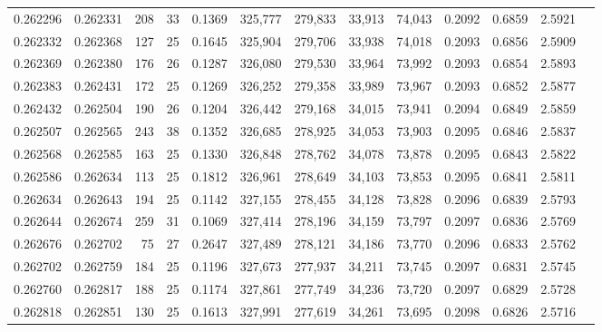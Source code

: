 \begin{tabular}{rrrrrrrrrrrrr}
0.262296 & 0.262331 &   208 &  33 &                                     0.1369 & 325,777 & 279,833 &  33,913 &  74,043 & 0.2092 & 0.6859 & 2.5921 \\
0.262332 & 0.262368 &   127 &  25 &                                     0.1645 & 325,904 & 279,706 &  33,938 &  74,018 & 0.2093 & 0.6856 & 2.5909 \\
0.262369 & 0.262380 &   176 &  26 &                                     0.1287 & 326,080 & 279,530 &  33,964 &  73,992 & 0.2093 & 0.6854 & 2.5893 \\
0.262383 & 0.262431 &   172 &  25 &                                     0.1269 & 326,252 & 279,358 &  33,989 &  73,967 & 0.2093 & 0.6852 & 2.5877 \\
0.262432 & 0.262504 &   190 &  26 &                                     0.1204 & 326,442 & 279,168 &  34,015 &  73,941 & 0.2094 & 0.6849 & 2.5859 \\
0.262507 & 0.262565 &   243 &  38 &                                     0.1352 & 326,685 & 278,925 &  34,053 &  73,903 & 0.2095 & 0.6846 & 2.5837 \\
0.262568 & 0.262585 &   163 &  25 &                                     0.1330 & 326,848 & 278,762 &  34,078 &  73,878 & 0.2095 & 0.6843 & 2.5822 \\
0.262586 & 0.262634 &   113 &  25 &                                     0.1812 & 326,961 & 278,649 &  34,103 &  73,853 & 0.2095 & 0.6841 & 2.5811 \\
0.262634 & 0.262643 &   194 &  25 &                                     0.1142 & 327,155 & 278,455 &  34,128 &  73,828 & 0.2096 & 0.6839 & 2.5793 \\
0.262644 & 0.262674 &   259 &  31 &                                     0.1069 & 327,414 & 278,196 &  34,159 &  73,797 & 0.2097 & 0.6836 & 2.5769 \\
0.262676 & 0.262702 &    75 &  27 &                                     0.2647 & 327,489 & 278,121 &  34,186 &  73,770 & 0.2096 & 0.6833 & 2.5762 \\
0.262702 & 0.262759 &   184 &  25 &                                     0.1196 & 327,673 & 277,937 &  34,211 &  73,745 & 0.2097 & 0.6831 & 2.5745 \\
0.262760 & 0.262817 &   188 &  25 &                                     0.1174 & 327,861 & 277,749 &  34,236 &  73,720 & 0.2097 & 0.6829 & 2.5728 \\
0.262818 & 0.262851 &   130 &  25 &                                     0.1613 & 327,991 & 277,619 &  34,261 &  73,695 & 0.2098 & 0.6826 & 2.5716 \\

\end{tabular}
